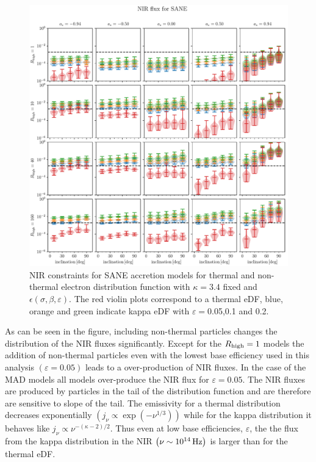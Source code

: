 \begin{figure}
  \centering
  \includegraphics[width=\columnwidth]{./figures/SANE_NIR_standard.pdf}
  \caption{NIR constraints for SANE accretion models for thermal and non-thermal electron distribution function with $\kappa=3.4$ fixed and $\epsilon\left(\sigma,\beta,\varepsilon\right)$. The red violin plots correspond to a thermal eDF, blue, orange and green indicate kappa eDF with $\varepsilon=$0.05,0.1 and 0.2.}
  \label{fig:NIR_kappaepsilon}
\end{figure}

As can be seen in the figure, including non-thermal particles changes the distribution of the NIR fluxes significantly. Except for the $R_{\rm high}=1$ models the addition of non-thermal particles even with the lowest base efficiency used in this analysis $\left( \varepsilon=0.05\right)$ leads to a over-production of NIR fluxes. In the case of the MAD models all models over-produce the NIR flux for $\varepsilon=0.05$.
\newline The NIR fluxes are produced by particles in the tail of the distribution function and are therefore are sensitive to slope of the tail. The emissivity for a thermal distribution decreases exponentially $\left(j_{\nu}\propto\exp(-\nu^{1/3})\right)$ while for the kappa distribution it behaves like $j_{\nu}\propto \nu^{-(\kappa-2)/2}$. Thus even at low base efficiencies, $\varepsilon$, the the flux from the kappa distribution in the NIR $\left(\nu\sim 10^{14}\,\rm{Hz}\right)$ is larger than for the thermal eDF.

